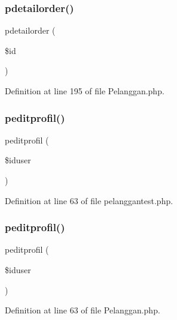 \subsubsection{\texorpdfstring{pdetailorder()}{pdetailorder()}\hspace{0.1cm}{\footnotesize\ttfamily [2/2]}}
{\footnotesize\ttfamily pdetailorder (\begin{DoxyParamCaption}\item[{}]{\$id }\end{DoxyParamCaption})}



Definition at line 195 of file Pelanggan.\+php.

\mbox{\label{class_pelanggan_a321df46e6899c5ecef512bee948efa2f}} 
\subsubsection{\texorpdfstring{peditprofil()}{peditprofil()}\hspace{0.1cm}{\footnotesize\ttfamily [1/2]}}
{\footnotesize\ttfamily peditprofil (\begin{DoxyParamCaption}\item[{}]{\$iduser }\end{DoxyParamCaption})}



Definition at line 63 of file pelanggantest.\+php.

\mbox{\label{class_pelanggan_a321df46e6899c5ecef512bee948efa2f}} 
\subsubsection{\texorpdfstring{peditprofil()}{peditprofil()}\hspace{0.1cm}{\footnotesize\ttfamily [2/2]}}
{\footnotesize\ttfamily peditprofil (\begin{DoxyParamCaption}\item[{}]{\$iduser }\end{DoxyParamCaption})}



Definition at line 63 of file Pelanggan.\+php.

\mbox{\label{class_pelanggan_a2184e0cd904ece2a3390ff342aedfeef}} 

